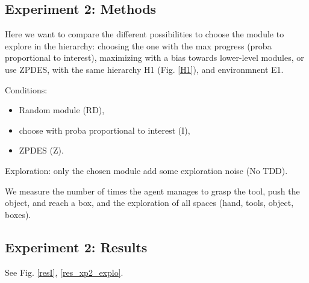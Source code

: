 \documentclass[conference]{include/IEEEtran}
\begin{document}
	
	\subsection{Experiment 2: Methods}	
		
		Here we want to compare the different possibilities to choose the module to explore in the hierarchy: choosing the one with the max progress (proba proportional to interest), 
		maximizing with a bias towards lower-level modules, or use ZPDES,
		with the same hierarchy H1 (Fig. \ref{H1}), and environmnent E1.
			
		Conditions:
		\begin{itemize}
			\item Random module (RD),
			\item choose with proba proportional to interest (I),
			\item ZPDES (Z).
		\end{itemize}
		
		Exploration: only the chosen module add some exploration noise (No TDD).
			
		We measure the number of times the agent manages to grasp the tool, push the object, and reach a box,
		and the exploration of all spaces (hand, tools, object, boxes).
		
	
	\subsection{Experiment 2: Results}

		See Fig. \ref{resI}, \ref{res_xp2_explo}.
		
\end{document}
